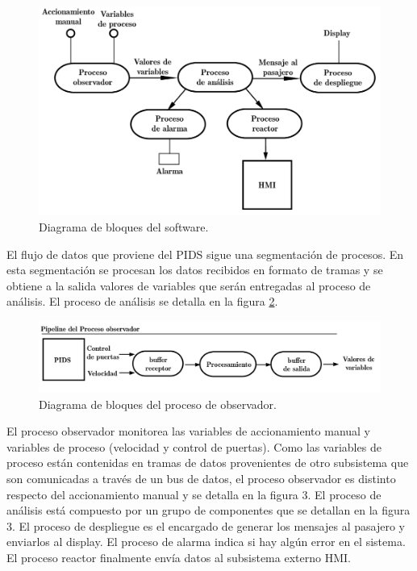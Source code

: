 \documentclass[
11pt, %
]{charter}
\begin{document}
\begin{figure}[htpb]
\centering 
\includegraphics[width=1\textwidth]{./Pics/observarYreaccionar.png}
\caption{Diagrama de bloques del software.}
\label{fig:pattern1}
\end{figure}

El flujo de datos que proviene del PIDS sigue una segmentación
de procesos. En esta segmentación se procesan los datos recibidos en formato de tramas y se obtiene a la salida
valores de variables que serán entregadas al proceso de análisis. El proceso de análisis
se detalla en la figura \ref{fig:pattern2}.

\begin{figure}[htpb]
\centering 
\includegraphics[width=1\textwidth]{./Pics/Pipeline.png}
\caption{Diagrama de bloques del proceso de observador.}
\label{fig:pattern2}
\end{figure}

El proceso observador monitorea las variables de accionamiento manual y variables de proceso
(velocidad y control de puertas). Como las variables de proceso están contenidas en tramas de datos
provenientes de otro subsistema que son comunicadas a través de un bus de datos, el proceso observador es distinto respecto del
accionamiento manual y se detalla en la figura 3. El proceso de análisis está compuesto por un
grupo de componentes que se detallan en la figura 3. El proceso de despliegue es el encargado
de generar los mensajes al pasajero y enviarlos al display. El proceso de alarma indica si hay
algún error en el sistema. El proceso reactor finalmente envía datos al subsistema externo HMI.
\end{document}
